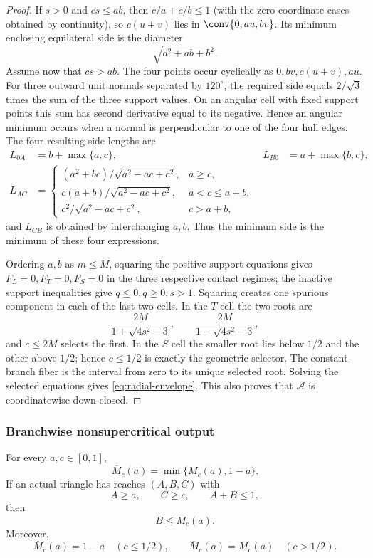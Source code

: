 \begin{proof}
If $s>0$ and $cs\le ab$, then $c/a+c/b\le1$ (with the zero-coordinate
cases obtained by continuity), so $c(u+v)$ lies in
$\conv\{0,au,bv\}$.  Its minimum enclosing equilateral side is the diameter
\[
 \sqrt{a^2+ab+b^2}.
\]
Assume now that $cs>ab$.  The four points occur cyclically as
$0,bv,c(u+v),au$.  For three outward unit normals separated by
$120^\circ$, the required side equals $2/\sqrt3$ times the sum of the three
support values.  On an angular cell with fixed support points this sum has
second derivative equal to its negative.  Hence an angular minimum occurs
when a normal is perpendicular to one of the four hull edges.  The four
resulting side lengths are
\begin{align*}
 L_{0A}&=b+\max\{a,c\},&
 L_{B0}&=a+\max\{b,c\},\\
 L_{AC}&=
 \begin{cases}
 (a^2+bc)/\sqrt{a^2-ac+c^2},&a\ge c,\\
 c(a+b)/\sqrt{a^2-ac+c^2},&a<c\le a+b,\\
 c^2/\sqrt{a^2-ac+c^2},&c>a+b,
 \end{cases}
\end{align*}
and $L_{CB}$ is obtained by interchanging $a,b$.  Thus the minimum side is
the minimum of these four expressions.

Ordering $a,b$ as $m\le M$, squaring the positive support equations gives
$F_L=0,F_T=0,F_S=0$ in the three respective contact regimes; the inactive
support inequalities give $q\le0,q\ge0,s>1$.  Squaring creates one spurious
component in each of the last two cells.  In the $T$ cell the two roots are
\[
 \frac{2M}{1+\sqrt{4s^2-3}},
 \qquad
 \frac{2M}{1-\sqrt{4s^2-3}},
\]
and $c\le2M$ selects the first.  In the $S$ cell the smaller root lies below
$1/2$ and the other above $1/2$; hence $c\le1/2$ is exactly the geometric
selector.  The constant-branch fiber is the interval from zero to its unique selected
root.  Solving the selected equations gives \eqref{eq:radial-envelope}.
This also proves that $\mathcal A$ is coordinatewise down-closed.
\end{proof}

\subsubsection{Branchwise nonsupercritical output}

\begin{proposition}
\label{prop:branchwise-safe-output}
For every $a,c\in[0,1]$,
\[
 \overline M_c(a)=\min\{M_c(a),1-a\}.
\]
If an actual triangle has reaches $(A,B,C)$ with
\[
 A\ge a,\qquad C\ge c,\qquad A+B\le1,
\]
then
\begin{equation}
 B\le \overline M_c(a).
 \label{eq:safe-capped-bound}
\end{equation}
Moreover,
\[
 \overline M_c(a)=1-a\quad(c\le1/2),
 \qquad
 \overline M_c(a)=M_c(a)\quad(c>1/2).
\]
\end{proposition}

